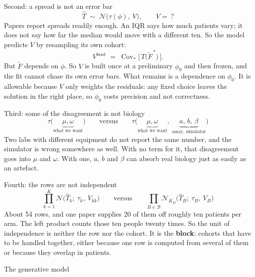 \documentclass[10pt,aspectratio=169]{beamer}
\newcommand{\Ncal}{\mathcal{N}}
\newcommand{\Bset}{\mathcal{B}}
\DeclareMathOperator*{\Cov}{Cov}
\newcommand{\term}[1]{\alert{\textbf{#1}}}
\begin{document}
\begin{frame}[t]{Second: a spread is not an error bar}
  \[ \widehat T \;\sim\; \Ncal\big(\tau(\phi),\ V\big), \qquad V = \ ? \]
  Papers report spreads readily enough. An IQR says how much patients vary; it
  does not say how far the median would move with a different ten. So the model
  predicts $V$ by resampling its own cohort:
  \[ V^{\text{boot}} \;=\; \Cov_{\ast}\big[\,T\big(\tilde F^{\,\ast}\big)\,\big] . \]
  \vfill
  But $\tilde F$ depends on $\phi$. So $V$ is built once at a preliminary
  $\phi_0$ and then frozen, and the fit cannot chase its own error bars.
  \vfill
  What remains is a dependence on $\phi_0$. It is allowable because $V$ only
  weights the residuals: any fixed choice leaves the solution in the right
  place, so $\phi_0$ costs precision and not correctness.
\end{frame}

\begin{frame}[t]{Third: some of the disagreement is not biology}
  \[
    \tau\big(\underbrace{\mu,\omega}_{\text{what we want}}\big)
    \qquad\text{versus}\qquad
    \tau\big(\underbrace{\mu,\omega}_{\text{what we want}},\
      \underbrace{a,\,b,\,\beta}_{\text{assay, simulator}}\big)
  \]
  Two labs with different equipment do not report the same number, and the
  simulator is wrong somewhere as well.
  \vfill
  With no term for it, that disagreement goes into $\mu$ and $\omega$. With one,
  $a$, $b$ and $\beta$ can absorb real biology just as easily as an artefact.
\end{frame}

\begin{frame}[t]{Fourth: the rows are not independent}
  \[
    \prod_{k=1}^{K}\Ncal\big(\widehat T_k;\ \tau_k,\ V_{kk}\big)
    \qquad\text{versus}\qquad
    \prod_{B\in\Bset}\Ncal_{K_B}\big(\widehat T_B;\ \tau_B,\ V_B\big)
  \]
  About 54 rows, and one paper supplies 20 of them off roughly ten patients per
  arm. The left product counts those ten people twenty times.
  \vfill
  So the unit of independence is neither the row nor the cohort. It is the
  \term{block}: cohorts that have to be handled together, either because one row
  is computed from several of them or because they overlap in patients.
\end{frame}

\begin{frame}[standout]
  The generative model
\end{frame}
\end{document}
